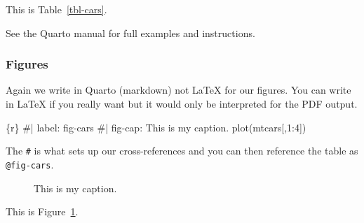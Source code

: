 \documentclass[
]{article}
\newenvironment{Shaded}{\begin{snugshade}}{\end{snugshade}}
\newcommand{\InformationTok}[1]{\textcolor[rgb]{0.37,0.37,0.37}{#1}}
\begin{document}
This is Table~\ref{tbl-cars}.

See the Quarto manual for full examples and instructions.

\subsubsection{Figures}\label{figures}

Again we write in Quarto (markdown) not \LaTeX{} for our figures. You
can write in \LaTeX{} if you really want but it would only be
interpreted for the PDF output.

\begin{Shaded}
\begin{Highlighting}[]
\InformationTok{\textasciigrave{}\textasciigrave{}\textasciigrave{}\{r\}}
\InformationTok{\#| label: fig{-}cars}
\InformationTok{\#| fig{-}cap: This is my caption.}
\InformationTok{plot(mtcars[,1:4])}
\InformationTok{\textasciigrave{}\textasciigrave{}\textasciigrave{}}
\end{Highlighting}
\end{Shaded}

The \texttt{\#\textbar{}} is what sets up our cross-references and you
can then reference the table as \texttt{@fig-cars}.

\begin{figure}


\caption{\label{fig-cars}This is my caption.}

\end{figure}%

This is Figure~\ref{fig-cars}.
\end{document}
